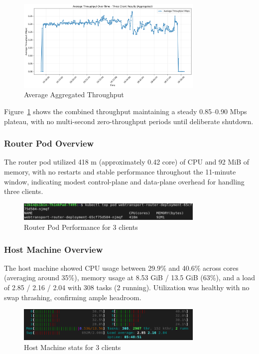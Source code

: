 \begin{figure}[h!]
\centering
\includegraphics[width=0.8\textwidth]{Evaluation/avg_throughput_aggregated_three-client-results.png}
\caption{Average Aggregated Throughput}
\label{fig:avg-throughput-aggregated}
\end{figure}
Figure~\ref{fig:avg-throughput-aggregated} shows the combined throughput maintaining a steady 0.85–0.90 Mbps plateau, with no multi-second zero-throughput periods until deliberate shutdown.

\subsubsection{Router Pod Overview}
The router pod utilized 418 m (approximately 0.42 core) of CPU and 92 MiB of memory, with no restarts and stable performance throughout the 11-minute window, indicating modest control-plane and data-plane overhead for handling three clients.
\begin{figure}[h!]
\centering
\includegraphics[width=0.8\textwidth]{Evaluation/three-clients-stats.png}
\caption{Router Pod Performance for 3 clients}
\label{fig:three-clients-stats}
\end{figure}

\subsubsection{Host Machine Overview}
The host machine showed CPU usage between 29.9\% and 40.6\% across cores (averaging around 35\%), memory usage at 8.53 GiB / 13.5 GiB (63\%), and a load of 2.85 / 2.16 / 2.04 with 308 tasks (2 running). Utilization was healthy with no swap thrashing, confirming ample headroom.

\begin{figure}[h!]
\centering
\includegraphics[width=0.8\textwidth]{Evaluation/three-clients-host-stats.png}
\caption{Host Machine stats for 3 clients}
\label{fig:three-clients-host-stats}
\end{figure}

